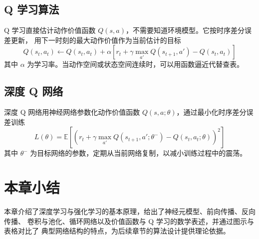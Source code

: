 \subsection{Q 学习算法}

Q 学习直接估计动作价值函数 $Q(s,a)$，不需要知道环境模型。它按时序差分误差更新，
用下一时刻的最大动作价值作为当前估计的目标
\begin{equation}
  Q(s_t, a_t) \leftarrow Q(s_t, a_t) + \alpha \left[ r_t + \gamma \max_{a'} Q(s_{t+1}, a') - Q(s_t, a_t) \right]
  \label{eq:qlearning}
\end{equation}
其中 $\alpha$ 为学习率。当动作空间或状态空间连续时，可以用函数逼近代替查表。

\subsection{深度 Q 网络}

深度 Q 网络用神经网络参数化动作价值函数 $Q(s,a;\theta)$，通过最小化时序差分误差训练
\begin{equation}
  L(\theta) = \mathbb{E}\left[ \left( r_t + \gamma \max_{a'} Q(s_{t+1}, a'; \theta^{-}) - Q(s_t, a_t; \theta) \right)^{2} \right]
  \label{eq:dqn}
\end{equation}
其中 $\theta^{-}$ 为目标网络的参数，定期从当前网络复制，以减小训练过程中的震荡。

\section{本章小结}

本章介绍了深度学习与强化学习的基本原理，给出了神经元模型、前向传播、反向传播、
卷积与池化、循环网络以及价值函数与 Q 学习的数学表述，并通过图示与表格对比了
典型网络结构的特点，为后续章节的算法设计提供理论依据。
